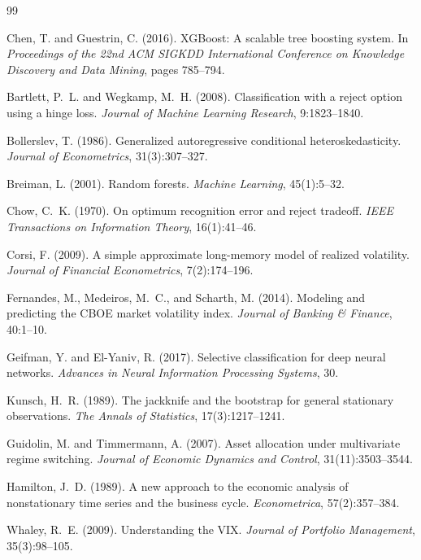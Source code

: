 \documentclass[12pt]{article}
\begin{document}

\begin{thebibliography}{99}

Chen, T. and Guestrin, C. (2016).
\newblock XGBoost: A scalable tree boosting system.
\newblock In \emph{Proceedings of the 22nd ACM SIGKDD International Conference on Knowledge Discovery and Data Mining}, pages 785--794.

Bartlett, P.~L. and Wegkamp, M.~H. (2008).
\newblock Classification with a reject option using a hinge loss.
\newblock \emph{Journal of Machine Learning Research}, 9:1823--1840.

Bollerslev, T. (1986).
\newblock Generalized autoregressive conditional heteroskedasticity.
\newblock \emph{Journal of Econometrics}, 31(3):307--327.

Breiman, L. (2001).
\newblock Random forests.
\newblock \emph{Machine Learning}, 45(1):5--32.

Chow, C.~K. (1970).
\newblock On optimum recognition error and reject tradeoff.
\newblock \emph{IEEE Transactions on Information Theory}, 16(1):41--46.

Corsi, F. (2009).
\newblock A simple approximate long-memory model of realized volatility.
\newblock \emph{Journal of Financial Econometrics}, 7(2):174--196.

Fernandes, M., Medeiros, M.~C., and Scharth, M. (2014).
\newblock Modeling and predicting the CBOE market volatility index.
\newblock \emph{Journal of Banking \& Finance}, 40:1--10.

Geifman, Y. and El-Yaniv, R. (2017).
\newblock Selective classification for deep neural networks.
\newblock \emph{Advances in Neural Information Processing Systems}, 30.

Kunsch, H.~R. (1989).
\newblock The jackknife and the bootstrap for general stationary observations.
\newblock \emph{The Annals of Statistics}, 17(3):1217--1241.

Guidolin, M. and Timmermann, A. (2007).
\newblock Asset allocation under multivariate regime switching.
\newblock \emph{Journal of Economic Dynamics and Control}, 31(11):3503--3544.

Hamilton, J.~D. (1989).
\newblock A new approach to the economic analysis of nonstationary time series and the business cycle.
\newblock \emph{Econometrica}, 57(2):357--384.

Whaley, R.~E. (2009).
\newblock Understanding the VIX.
\newblock \emph{Journal of Portfolio Management}, 35(3):98--105.

\end{thebibliography}
\end{document}
